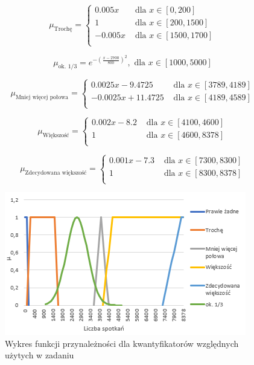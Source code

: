 \documentclass{classrep}
\begin{document}
  \begin{equation}
    \mu_{\text{Trochę}} =
      \begin{cases}
        0.005x & \text{ dla } x \in [0,200] \\
        1 & \text{ dla } x \in [200,1500] \\
        -0.005x & \text{ dla } x \in [1500,1700] \\
      \end{cases}  
  \end{equation}
  
  \begin{equation}
    \mu_{\text{ok. 1/3}} = e^{-(\frac{x-2700}{800})^2}, \text{ dla } x \in [1000,5000]
  \end{equation}

   \begin{equation}
    \mu_{\text{Mniej więcej połowa}} =
      \begin{cases}
        0.0025x - 9.4725 & \text{ dla } x \in [3789,4189] \\
        -0.0025x + 11.4725 & \text{ dla } x \in [4189,4589] \\
      \end{cases}  
  \end{equation}
  
  \begin{equation}
    \mu_{\text{Większość}} =
      \begin{cases}
        0.002x - 8.2 & \text{ dla } x \in [4100,4600] \\
        1 & \text{ dla } x \in [4600,8378] \\
      \end{cases}  
  \end{equation}
  
  \begin{equation}
    \mu_{\text{Zdecydowana większość}} =
      \begin{cases}
        0.001x - 7.3 & \text{ dla } x \in [7300,8300] \\
        1 & \text{ dla } x \in [8300,8378] \\
      \end{cases}  
  \end{equation}
  
 \begin{figure}[H]
 \centering
   \includegraphics{fp_qr.png}
   \caption{Wykres funkcji przynależności dla kwantyfikatorów względnych użytych w zadaniu}
 \end{figure}
\end{document}
